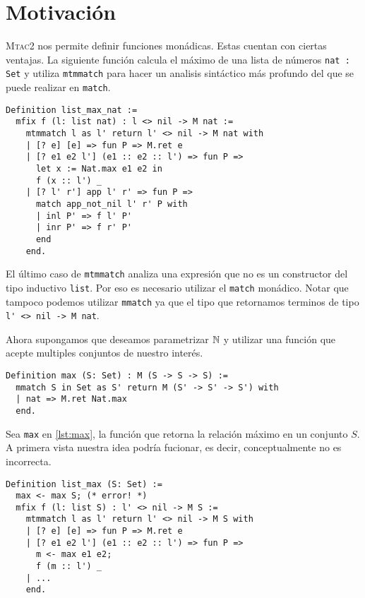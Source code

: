 \chapter{Motivación}\label{ch:motivacion}

\textsc{Mtac2} nos permite definir funciones monádicas. Estas cuentan con ciertas ventajas.
La siguiente función calcula el máximo de una lista de números \lstinline{nat : Set} y utiliza \lstinline{mtmmatch} para hacer un analisis sintáctico más profundo del que se puede realizar en \lstinline{match}. %

\begin{lstlisting}[float=h,frame=tb,caption={Teorema y prueba en Coq},label=lst:list_max_nat]
Definition list_max_nat :=
  mfix f (l: list nat) : l <> nil -> M nat :=
    mtmmatch l as l' return l' <> nil -> M nat with
    | [? e] [e] => fun P => M.ret e
    | [? e1 e2 l'] (e1 :: e2 :: l') => fun P =>
      let x := Nat.max e1 e2 in
      f (x :: l') _
    | [? l' r'] app l' r' => fun P =>
      match app_not_nil l' r' P with
      | inl P' => f l' P'
      | inr P' => f r' P'
      end
    end.
\end{lstlisting}

El último caso de \lstinline{mtmmatch} analiza una expresión que no es un constructor del tipo inductivo \lstinline{list}. Por eso es necesario utilizar el \lstinline{match} monádico.
Notar que tampoco podemos utilizar \lstinline{mmatch} ya que el tipo que retornamos terminos de tipo \lstinline{l' <> nil -> M nat}.

Ahora supongamos que deseamos parametrizar $\mathbb{N}$ y utilizar una función que acepte multiples conjuntos de nuestro interés.
\begin{lstlisting}[float=h,frame=tb,caption={Teorema y prueba en Coq},label=lst:max]
Definition max (S: Set) : M (S -> S -> S) :=
  mmatch S in Set as S' return M (S' -> S' -> S') with
  | nat => M.ret Nat.max
  end.
\end{lstlisting}
Sea \lstinline{max} en \ref{lst:max}, la función que retorna la relación máximo en un conjunto $S$.
A primera vista nuestra idea podría fucionar, es decir, conceptualmente no es incorrecta.

\begin{lstlisting}[float=h,frame=tb,caption={Teorema y prueba en Coq},label=lst:list_max]
Definition list_max (S: Set) :=
  max <- max S; (* error! *)
  mfix f (l: list S) : l' <> nil -> M S :=
    mtmmatch l as l' return l' <> nil -> M S with
    | [? e] [e] => fun P => M.ret e
    | [? e1 e2 l'] (e1 :: e2 :: l') => fun P =>
      m <- max e1 e2;
      f (m :: l') _
    | ...
    end.
\end{lstlisting}

